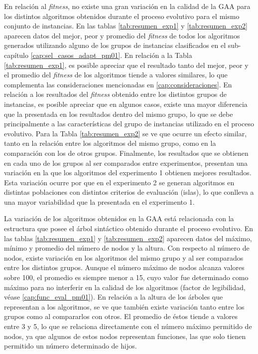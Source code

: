 En relación al \textit{fitness}, no existe una gran variación en la calidad de la GAA para los distintos algoritmos obtenidos durante el proceso evolutivo para el mismo conjunto de instancias. En las tablas \ref{tab:resumen_exp1} y \ref{tab:resumen_exp2} aparecen datos del mejor, peor y promedio del \textit{fitness} de todos los algoritmos generados utilizando alguno de los grupos de instancias clasificados en el sub-capítulo \ref{cap:sel_casos_adapt_pm01}. En relación a la Tabla \ref{tab:resumen_exp1}, es posible apreciar que el resultado tanto del mejor, peor y el promedio del \textit{fitness} de los algoritmos tiende a valores similares, lo que complementa las consideraciones mencionadas en \ref{cap:consideraciones}. En relación a los resultados del \textit{fitness} obtenido entre los distintos grupos de instancias, es posible apreciar que en algunos casos, existe una mayor diferencia que la presentada en los resultados dentro del mismo grupo, lo que se debe principalmente a las características del grupo de instancias utilizado en el proceso evolutivo. Para la Tabla \ref{tab:resumen_exp2} se ve que ocurre un efecto similar, tanto en la relación entre los algoritmos del mismo grupo, como en la comparación con los de otros grupos. Finalmente, los resultados que se obtienen en cada uno de los grupos al ser comparados entre experimentos, presentan una variación en la que los algoritmos del experimento 1 obtienen mejores resultados. Esta variación ocurre por que en el experimento 2 se generan algoritmos en distintas poblaciones con distintos criterios de evaluación (islas), lo que conlleva a una mayor variabilidad que la presentada en el experimento 1.

La variación de los algoritmos obtenidos en la GAA está relacionada con la estructura  que posee el árbol sintáctico obtenido durante el proceso evolutivo. En las tablas \ref{tab:resumen_exp1} y \ref{tab:resumen_exp2} aparecen datos del máximo, mínimo y promedio del número de nodos y la altura. Con respecto al número de nodos, existe variación en los algoritmos del mismo grupo y al ser comparados entre los distintos grupos. Aunque el número máximo de nodos alcanza valores sobre 100, el promedio es siempre menor a 15, cuyo valor fue determinado como máximo para no interferir en la calidad de los algoritmos (factor de legibilidad, véase \ref{cap:func_eval_pm01}). En relación a la altura de los árboles que representan a los algoritmos, se ve que también existe variación tanto entre los grupos como al compararlos con otros. El promedio de éstos tiende a valores entre 3 y 5, lo que se relaciona directamente con el número máximo permitido de nodos, ya que algunos de estos nodos representan funciones, las que solo tienen permitido un número determinado de hijos.

